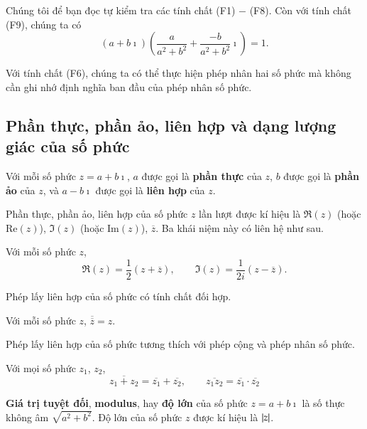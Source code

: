 Chúng tôi để bạn đọc tự kiểm tra các tính chất (F1) $-$ (F8). Còn với tính chất (F9), chúng ta có
\[
	(a + b\imath)\left(\frac{a}{a^{2}+b^{2}} + \frac{-b}{a^{2}+b^{2}}\imath\right) = 1.
\]

Với tính chất (F6), chúng ta có thể thực hiện phép nhân hai số phức mà không cần ghi nhớ định nghĩa ban đầu của phép nhân số phức.

\subsection{Phần thực, phần ảo, liên hợp và dạng lượng giác của số phức}

\begin{definition}
	Với mỗi số phức $z = a + b\imath$, $a$ được gọi là \textbf{phần thực} của $z$, $b$ được gọi là \textbf{phần ảo} của $z$, và $a - b\imath$ được gọi là \textbf{liên hợp} của $z$.

\end{definition}

Phần thực, phần ảo, liên hợp của số phức $z$ lần lượt được kí hiệu là $\Re{(z)}$ (hoặc $\text{Re}(z)$), $\Im{(z)}$ (hoặc $\text{Im}(z)$), $\overline{z}$. Ba khái niệm này có liên hệ như sau.

\begin{theorem}
	Với mỗi số phức $z$,
	\[
		\Re{(z)} = \frac{1}{2}(z + \overline{z}),\qquad \Im{(z)} = \frac{1}{2i}(z - \overline{z}).
	\]
\end{theorem}

Phép lấy liên hợp của số phức có tính chất đối hợp.
\begin{theorem}
	Với mỗi số phức $z$, $\overline{\overline{z}} = z$.
\end{theorem}

Phép lấy liên hợp của số phức tương thích với phép cộng và phép nhân số phức.
\begin{theorem}
	Với mọi số phức $z_{1}$, $z_{2}$,
	\[
		\overline{z_{1} + z_{2}} = \overline{z_{1}} + \overline{z_{2}},\qquad \overline{z_{1}z_{2}} = \overline{z_{1}}\cdot\overline{z_{2}}
	\]
\end{theorem}

\begin{definition}
	\textbf{Giá trị tuyệt đối}, \textbf{modulus}, hay \textbf{độ lớn} của số phức $z = a + b\imath$ là số thực không âm $\sqrt{a^{2} + b^{2}}$. Độ lớn của số phức $z$ được kí hiệu là $\left\vert{z}\right\vert$.
\end{definition}

